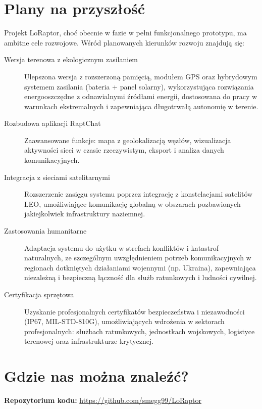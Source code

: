 \clearpage
\section{Plany na przyszłość}

Projekt LoRaptor, choć obecnie w fazie w pełni funkcjonalnego prototypu, ma ambitne cele rozwojowe. Wśród planowanych kierunków rozwoju znajdują się:

\begin{description}
	\item[Wersja terenowa z ekologicznym zasilaniem]
	Ulepszona wersja z rozszerzoną pamięcią, modułem GPS oraz hybrydowym systemem zasilania (bateria + panel solarny), wykorzystująca rozwiązania energooszczędne z odnawialnymi źródłami energii, dostosowana do pracy w warunkach ekstremalnych i zapewniająca długotrwałą autonomię w terenie.
	
	\item[Rozbudowa aplikacji RaptChat]
	Zaawansowane funkcje: mapa z geolokalizacją węzłów, wizualizacja aktywności sieci w czasie rzeczywistym, eksport i analiza danych komunikacyjnych.
	
	\item[Integracja z sieciami satelitarnymi] 
	Rozszerzenie zasięgu systemu poprzez integrację z konstelacjami satelitów LEO, umożliwiające komunikację globalną w obszarach pozbawionych jakiejkolwiek infrastruktury naziemnej.
	
	\item[Zastosowania humanitarne]
	Adaptacja systemu do użytku w strefach konfliktów i katastrof naturalnych, ze szczególnym uwzględnieniem potrzeb komunikacyjnych w regionach dotkniętych działaniami wojennymi (np. Ukraina), zapewniająca niezależną i bezpieczną łączność dla służb ratunkowych i ludności cywilnej.
	
	\item[Certyfikacja sprzętowa]
	Uzyskanie profesjonalnych certyfikatów bezpieczeństwa i niezawodności (IP67, MIL-STD-810G), umożliwiających wdrożenia w sektorach profesjonalnych: służbach ratunkowych, jednostkach wojskowych, logistyce terenowej oraz infrastrukturze krytycznej.
\end{description}

\section{Gdzie nas można znaleźć?}

\textbf{Repozytorium kodu:} \url{https://github.com/smegg99/LoRaptor}

